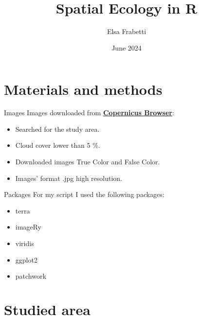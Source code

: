 \documentclass{beamer}
\title{Spatial Ecology in R}
\author{Elsa Frabetti}
\institute{Global change ecology - Unibo}
\date{June 2024}
\begin{document}
\maketitle
{} %


\section{Materials and methods} %

\begin{frame}{Images}
    Images downloaded from \textbf{\href{https://browser.dataspace.copernicus.eu}{Copernicus Browser}}:
    \bigskip
    \begin{itemize}
        \item Searched for the study area.
        \item  Cloud cover lower than 5 \%.
        \item Downloaded images True Color and False Color.
        \item Images' format .jpg high resolution.
    \end{itemize}
\end{frame}

\begin{frame}{Packages} 
    For my script I used the following packages:
    \bigskip %
    \begin{itemize} %
        \item terra
        \item imageRy
        \item viridis
        \item ggplot2
        \item patchwork
        \end{itemize}
\end{frame}


\section{Studied area} %
\end{document}

